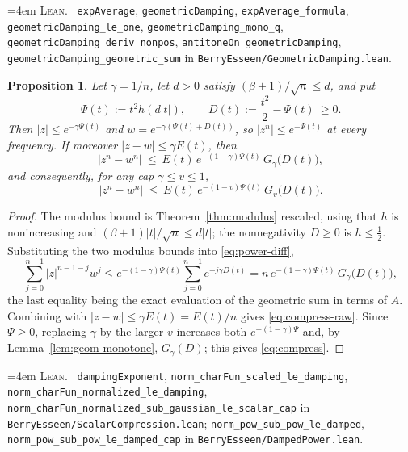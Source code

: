 \documentclass[10pt,a4paper]{article}
\theoremstyle{plain}
\newtheorem{proposition}[theorem]{Proposition}
\theoremstyle{definition}
\newcommand{\lean}[1]{\texttt{#1}}
\newcommand{\file}[1]{\texttt{#1}}
\newenvironment{leanref}%
  {\par\addvspace{3pt}\begingroup\sloppy\emergencystretch=4em
   \noindent\footnotesize\textsc{Lean.}\ \ignorespaces}%
  {\par\endgroup\addvspace{3pt}}
\begin{document}
\begin{leanref}
\lean{expAverage}, \lean{geometricDamping}, \lean{expAverage\_formula},
\lean{geometricDamping\_le\_one}, \lean{geometricDamping\_mono\_q},
\lean{geometricDamping\_deriv\_nonpos},
\lean{antitoneOn\_geometricDamping},
\lean{geometricDamping\_geometric\_sum} in
\file{BerryEsseen/GeometricDamping.lean}.
\end{leanref}

\begin{proposition}\label{prop:compression}
Let $\gamma=1/n$, let $d>0$ satisfy $(\beta+1)/\sqrt n\le d$, and put
\[
  \Psi(t) := t^2h(d|t|), \qquad D(t) := \frac{t^2}{2}-\Psi(t)\ \ge0 .
\]
Then $|z|\le e^{-\gamma\Psi(t)}$ and $w=e^{-\gamma(\Psi(t)+D(t))}$, so
$|z^n|\le e^{-\Psi(t)}$ at every frequency. If moreover
$|z-w|\le\gamma E(t)$, then
\begin{equation}\label{eq:compress-raw}
  |z^n-w^n| \ \le\ E(t)\,e^{-(1-\gamma)\Psi(t)}\,G_\gamma\bigl(D(t)\bigr),
\end{equation}
and consequently, for any cap $\gamma\le v\le1$,
\begin{equation}\label{eq:compress}
  \boxed{\ |z^n-w^n| \ \le\ E(t)\,e^{-(1-v)\Psi(t)}\,G_v\bigl(D(t)\bigr).\ }
\end{equation}
\end{proposition}

\begin{proof}
The modulus bound is Theorem~\ref{thm:modulus} rescaled, using that $h$ is
nonincreasing and $(\beta+1)|t|/\sqrt n\le d|t|$; the nonnegativity
$D\ge0$ is $h\le\tfrac12$. Substituting the two modulus bounds into
\eqref{eq:power-diff},
\[
  \sum_{j=0}^{n-1}|z|^{n-1-j}w^j
  \le e^{-(1-\gamma)\Psi(t)}\sum_{j=0}^{n-1}e^{-j\gamma D(t)}
  = n\,e^{-(1-\gamma)\Psi(t)}\,G_\gamma\bigl(D(t)\bigr),
\]
the last equality being the exact evaluation of the geometric sum in terms of
$A$. Combining with $|z-w|\le\gamma E(t)=E(t)/n$ gives
\eqref{eq:compress-raw}. Since $\Psi\ge0$, replacing $\gamma$ by the larger $v$
increases both $e^{-(1-\gamma)\Psi}$ and, by Lemma~\ref{lem:geom-monotone},
$G_\gamma(D)$; this gives \eqref{eq:compress}.
\end{proof}

\begin{leanref}
\lean{dampingExponent}, \lean{norm\_charFun\_scaled\_le\_damping},
\lean{norm\_charFun\_normalized\_le\_damping},
\lean{norm\_charFun\_normalized\_sub\_gaussian\_le\_scalar\_cap} in
\file{BerryEsseen/ScalarCompression.lean};
\lean{norm\_pow\_sub\_pow\_le\_damped},
\lean{norm\_pow\_sub\_pow\_le\_damped\_cap} in
\file{BerryEsseen/DampedPower.lean}.
\end{leanref}
\end{document}

